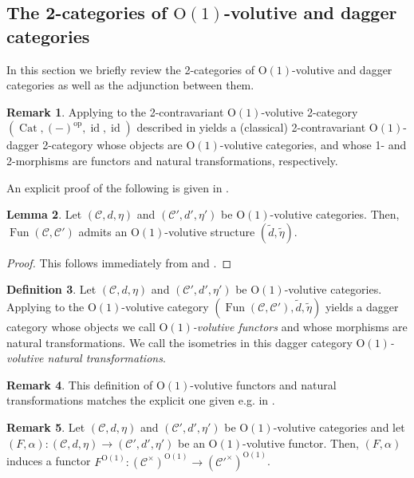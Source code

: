 \documentclass{article}
\newcommand{\opp}{\operatorname{op}}%
\newcommand{\id}{\operatorname{id}}%
\newcommand{\Cat}{\operatorname{Cat}}%
\newcommand{\Fun}{\operatorname{Fun}}%
\newcommand{\Oone}{\operatorname{O(1)}}
\newcommand{\C}{\mathcal{C}}
\numberwithin{equation}{section}
\theoremstyle{definition}
\newtheorem{definition}{Definition}[subsection]
\newtheorem{lemma}[definition]{Lemma}
\newtheorem{remark}[definition]{Remark}
\theoremstyle{theorem}
\begin{document}
\subsection{The 2-categories of $\Oone$-volutive and dagger categories}
In this section we briefly review the 2-categories of $\Oone$-volutive and dagger categories as well as the adjunction between them. 
\begin{remark}\label{Remark: The dagger structure of volutive categories}
    Applying  to the 2-contravariant $\Oone$-volutive 2-category $(\Cat,(-)^{\opp},\id,\id)$ 
    described in  yields a (classical) 2-contravariant $\Oone$-dagger 2-category whose objects are 
    $\Oone$-volutive categories, and whose 1- and 2-morphisms are functors and natural transformations, respectively.
\end{remark}
An explicit proof of the following is given in \cite[Lemma 3.9]{Stehouwer2023DaggerCV}.
\begin{lemma}
    Let $(\C,d,\eta)$ and $(\C',d',\eta')$ be $\Oone$-volutive categories. Then, $\Fun(\C,\C')$ admits an $\Oone$-volutive structure $(\tilde{d},\tilde{\eta})$.
\end{lemma}
\begin{proof}
    This follows immediately from  and .
\end{proof}
\begin{definition}
    Let $(\C,d,\eta)$ and $(\C',d',\eta')$ be $\Oone$-volutive categories. Applying  
    to the $\Oone$-volutive category $(\Fun(\C,\C'),\tilde{d},\tilde{\eta})$ yields a dagger category whose objects we call \emph{$\Oone$-volutive functors} 
    and whose morphisms are natural transformations. We call the isometries in this dagger category \emph{$\Oone$-volutive natural transformations}. 
\end{definition}
\begin{remark}
    This definition of $\Oone$-volutive functors and natural transformations matches the explicit one given e.g. in \cite{Stehouwer2023DaggerCV}.
\end{remark}
\begin{remark}
    Let $(\C,d,\eta)$ and $(\C',d',\eta')$ be $\Oone$-volutive categories and let $(F,\alpha) \colon (\C,d,\eta) \to (\C',d',\eta')$ be an $\Oone$-volutive functor. 
    Then, $(F,\alpha)$ induces a functor $F^{\Oone} \colon (\C^\times)^{\Oone} \to (\C'^\times)^{\Oone}$. 
\end{remark}
\end{document}
